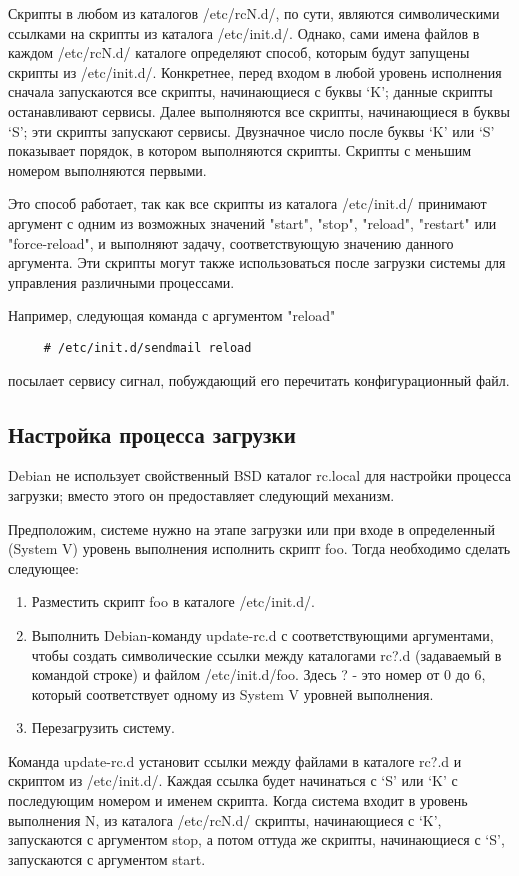 \documentclass[12pt,a4paper]{article}
\begin{document}
Скрипты в любом из каталогов /etc/rcN.d/, по сути, являются символическими ссылками на скрипты из каталога /etc/init.d/. Однако, сами имена файлов в каждом /etc/rcN.d/ каталоге определяют способ, которым будут запущены скрипты из /etc/init.d/. Конкретнее, перед входом в любой уровень исполнения сначала запускаются все скрипты, начинающиеся с буквы `K'; данные скрипты останавливают сервисы. Далее выполняются все скрипты, начинающиеся в буквы `S'; эти скрипты запускают сервисы. Двузначное число после буквы `K' или `S' показывает порядок, в котором выполняются скрипты. Скрипты с меньшим номером выполняются первыми.

Это способ работает, так как все скрипты из каталога /etc/init.d/ принимают аргумент с одним из возможных значений "start", "stop", "reload", "restart" или "force-reload", и выполняют задачу, соответствующую значению данного аргумента. Эти скрипты могут также использоваться после загрузки системы для управления различными процессами.

Например, следующая команда с аргументом "reload"

\verb+     # /etc/init.d/sendmail reload+

посылает сервису сигнал, побуждающий его перечитать конфигурационный файл.
\subsection{Настройка процесса загрузки}
Debian не использует свойственный BSD каталог rc.local для настройки процесса загрузки; вместо этого он предоставляет следующий механизм.

Предположим, системе нужно на этапе загрузки или при входе в определенный (System V) уровень выполнения исполнить скрипт foo. Тогда  необходимо сделать следующее:
\begin{enumerate}
  \item Разместить скрипт foo в каталоге /etc/init.d/.
  \item Выполнить Debian-команду update-rc.d с соответствующими аргументами, чтобы создать символические ссылки между каталогами rc?.d (задаваемый в командой строке) и файлом /etc/init.d/foo. Здесь ? - это номер от 0 до 6, который соответствует одному из System V уровней выполнения.
  \item Перезагрузить систему.
\end{enumerate}
Команда update-rc.d установит ссылки между файлами в каталоге rc?.d и скриптом из /etc/init.d/. Каждая ссылка будет начинаться с `S' или `K' с последующим номером и именем скрипта. Когда система входит в уровень выполнения N, из каталога /etc/rcN.d/ скрипты, начинающиеся с `K', запускаются с аргументом stop, а потом оттуда же скрипты, начинающиеся с `S', запускаются с аргументом start.
\end{document}
